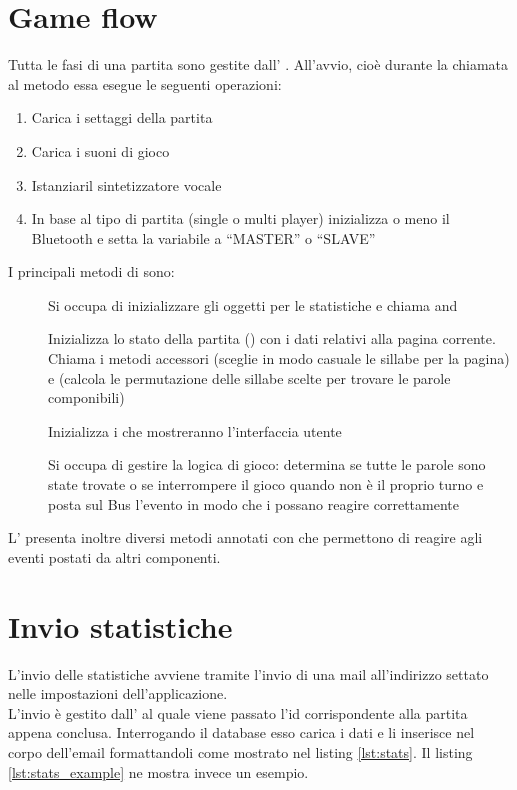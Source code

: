 \section{Game flow}
\label{sec:game_flow}
Tutta le fasi di una partita sono gestite dall' .
All'avvio, cioè durante la chiamata al metodo  essa esegue le seguenti operazioni:
\begin{enumerate}
\item Carica i settaggi della partita
\item Carica i suoni di gioco
\item Istanziaril sintetizzatore vocale 
\item In base al tipo di partita (single o multi player) inizializza o meno il Bluetooth e setta la variabile  a ``MASTER'' o ``SLAVE''
\end{enumerate}

I principali metodi di  sono:
\begin{description}
\item[] Si occupa di inizializzare gli oggetti per le statistiche e chiama  and 
\item[] Inizializza lo stato della partita () con i dati relativi alla pagina corrente. Chiama i metodi accessori  (sceglie in modo casuale le sillabe per la pagina) e  (calcola le permutazione delle sillabe scelte per trovare le parole componibili)
\item[] Inizializza i  che mostreranno l'interfaccia utente
\item[] Si occupa di gestire la logica di gioco: determina se tutte le parole sono state trovate o se interrompere il gioco quando non è il proprio turno e posta sul Bus l'evento  in modo che i  possano reagire correttamente
\end{description}

L' presenta inoltre diversi metodi annotati con  che permettono di reagire agli eventi postati da altri componenti.

\section{Invio statistiche}
\label{sec:stats_send}
L'invio delle statistiche avviene tramite l'invio di una mail all'indirizzo settato nelle impostazioni dell'applicazione.\\
L'invio è gestito dall'  al quale viene passato l'id corrispondente alla partita appena conclusa. Interrogando il database esso carica i dati e li inserisce nel corpo dell'email formattandoli come mostrato nel listing \ref{lst:stats}. Il listing \ref{lst:stats_example} ne mostra invece un esempio.

